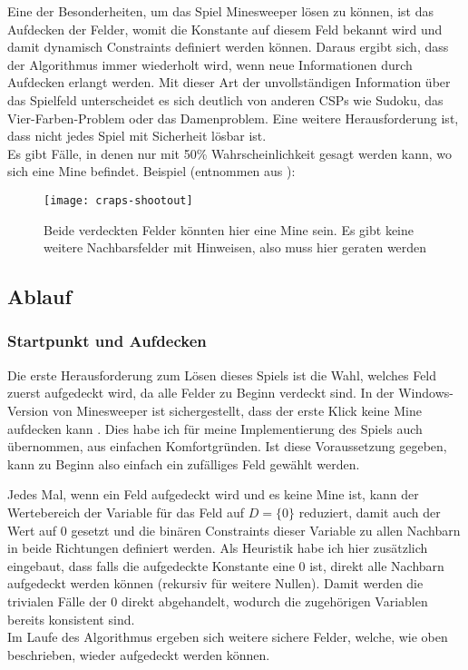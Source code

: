Eine der Besonderheiten, um das Spiel Minesweeper lösen zu können, ist das Aufdecken der Felder, womit die Konstante auf diesem Feld
bekannt wird und damit dynamisch Constraints definiert werden können. Daraus ergibt sich, dass der Algorithmus immer wiederholt wird,
wenn neue Informationen durch Aufdecken erlangt werden. Mit dieser Art der unvollständigen Information über das Spielfeld unterscheidet es
sich deutlich von anderen CSPs wie Sudoku, das Vier-Farben-Problem oder das Damenproblem.
Eine weitere Herausforderung ist, dass nicht jedes Spiel mit Sicherheit lösbar ist.\\ Es gibt Fälle, in denen nur mit 50\% Wahrscheinlichkeit
gesagt werden kann, wo sich eine Mine befindet. Beispiel (entnommen aus \cite{AlgoApproaches}):
\begin{figure}[!htb]
    \centering
    \texttt{[image: craps-shootout]}
    \caption{Beide verdeckten Felder könnten hier eine Mine sein. Es gibt keine weitere Nachbarsfelder mit Hinweisen, also muss hier geraten
    werden}\label{craps}
\end{figure}

\subsection{Ablauf}
\subsubsection{Startpunkt und Aufdecken}

Die erste Herausforderung zum Lösen dieses Spiels ist die Wahl, welches Feld zuerst aufgedeckt wird, da alle Felder zu Beginn verdeckt sind.
In der Windows-Version von Minesweeper ist sichergestellt, dass der erste Klick keine Mine aufdecken kann \cite{MS}. Dies habe ich für 
meine Implementierung des Spiels auch übernommen, aus einfachen Komfortgründen. Ist diese Voraussetzung gegeben, kann zu Beginn also einfach
ein zufälliges Feld gewählt werden.

Jedes Mal, wenn ein Feld aufgedeckt wird und es keine Mine ist, kann der Wertebereich der Variable für
das Feld auf $D=\{0\}$ reduziert, damit auch der Wert auf 0 gesetzt und die binären Constraints dieser Variable zu allen Nachbarn in beide
Richtungen definiert werden. Als Heuristik habe ich hier zusätzlich eingebaut, dass falls die aufgedeckte Konstante eine 0 ist, direkt
alle Nachbarn aufgedeckt werden können (rekursiv für weitere Nullen). Damit werden die trivialen Fälle der 0 direkt abgehandelt, wodurch
die zugehörigen Variablen bereits konsistent sind.\\
Im Laufe des Algorithmus ergeben sich weitere sichere Felder, welche, wie oben beschrieben, wieder aufgedeckt werden können.

